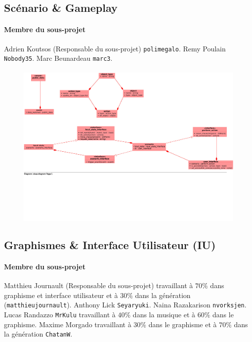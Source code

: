 \documentclass[a4paper,10pt]{article}
\begin{document}
\subsection{Scénario \& Gameplay}
\paragraph{Membre du sous-projet} Adrien Koutsos (Responsable du sous-projet) \verb!polimegalo!. Remy Poulain \verb!Nobody35!. Marc Beunardeau \verb!marc3!.
\paragraph{}

\begin{figure}[h]
 \includegraphics[width = \linewidth]{scenario-interface.jpg}
\end{figure}

\subsection{Graphismes \& Interface Utilisateur (IU)}
\paragraph{Membre du sous-projet} Matthieu Journault (Responsable du sous-projet) travaillant à $70\%$ dans graphisme et interface utilisateur et à $30\%$ dans la génération (\verb!matthieujournault!). Anthony Lick \verb!Seyaryuki!. Naina Razakarison \verb!nvorksjen!. Lucas Randazzo \verb!MrKulu! travaillant à $40\%$ dans la musique et à $60\%$ dans le graphisme. Maxime Morgado travaillant à  $30\%$ dans le graphisme et à  $70\%$ dans la génération \verb!ChatanW!.
\end{document}
